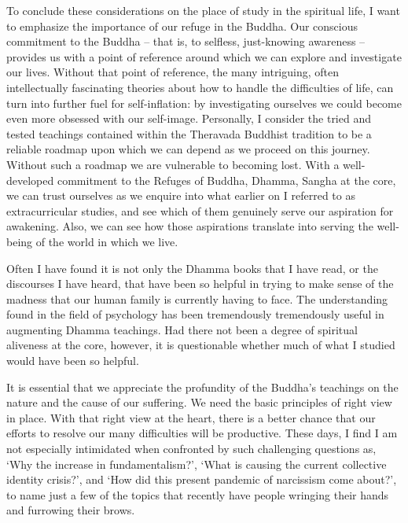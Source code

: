 \sectionBreak

To conclude these considerations on the place of study in the spiritual
life, I want to emphasize the importance of our refuge in the Buddha.
Our conscious commitment to the Buddha -- that is, to selfless,
just-knowing awareness -- provides us with a point of reference around
which we can explore and investigate our lives. Without that point of
reference, the many intriguing, often intellectually fascinating
theories about how to handle the difficulties of life, can turn into
further fuel for self-inflation: by investigating ourselves we could
become even more obsessed with our self-image. Personally, I consider
the tried and tested teachings contained within the Theravada Buddhist
tradition to be a reliable roadmap upon which we can depend as we
proceed on this journey. Without such a roadmap we are vulnerable to
becoming lost. With a well-developed commitment to the Refuges of
Buddha, Dhamma, Sangha at the core, we can trust ourselves as we enquire
into what earlier on I referred to as extracurricular studies, and see
which of them genuinely serve our aspiration for awakening. Also, we can
see how those aspirations translate into serving the well-being of the
world in which we live.

Often I have found it is not only the Dhamma books that I have read, or
the discourses I have heard, that have been so helpful in trying to make
sense of the madness that our human family is currently having to face.
The understanding found in the field of psychology has been tremendously
tremendously useful in augmenting Dhamma teachings. Had there not been a degree of
spiritual aliveness at the core, however, it is questionable whether
much of what I studied would have been so helpful.

It is essential that we appreciate the profundity of the Buddha's
teachings on the nature and the cause of our suffering. We need the
basic principles of right view in place. With that right view at the
heart, there is a better chance that our efforts to resolve our many
difficulties will be productive. These days, I find I am not especially
intimidated when confronted by such challenging questions as, `Why the
increase in fundamentalism?', `What is causing the current collective
identity crisis?', and `How did this present pandemic of narcissism come
about?', to name just a few of the topics that recently have people
wringing their hands and furrowing their brows.

